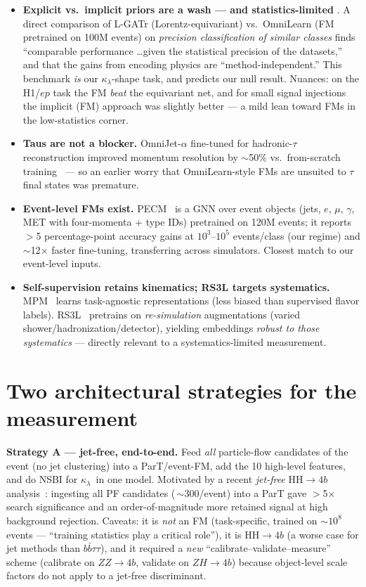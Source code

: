\documentclass[11pt]{article}
\newcommand{\kl}{\ensuremath{\kappa_\lambda}}
\newcommand{\bbtt}{\ensuremath{b\bar b\tau\tau}}
\begin{document}
\begin{itemize}
\item \textbf{Explicit vs.\ implicit priors are a wash --- and statistics-limited}
  \cite{wamorkar}. A direct comparison of L-GATr (Lorentz-equivariant) vs.\ OmniLearn
  (FM pretrained on 100M events) on \emph{precision classification of similar classes}
  finds ``comparable performance \dots given the statistical precision of the
  datasets,'' and that the gains from encoding physics are ``method-independent.''
  This benchmark \emph{is} our \kl-shape task, and predicts our null result. Nuances:
  on the H1/$ep$ task the FM \emph{beat} the equivariant net, and for small signal
  injections the implicit (FM) approach was slightly better --- a mild lean toward
  FMs in the low-statistics corner.
\item \textbf{Taus are not a blocker.} OmniJet-$\alpha$ fine-tuned for hadronic-$\tau$
  reconstruction improved momentum resolution by $\sim$50\% vs.\ from-scratch
  training~\cite{omnijettau} --- so an earlier worry that OmniLearn-style FMs are
  unsuited to $\tau$ final states was premature.
\item \textbf{Event-level FMs exist.} PECM~\cite{pecm} is a GNN over event objects
  (jets, $e$, $\mu$, $\gamma$, MET with four-momenta + type IDs) pretrained on 120M
  events; it reports $>$5 percentage-point accuracy gains at $10^3$--$10^5$
  events/class (our regime) and $\sim$12$\times$ faster fine-tuning, transferring
  across simulators. Closest match to our event-level inputs.
\item \textbf{Self-supervision retains kinematics; RS3L targets systematics.}
  MPM~\cite{mpm} learns task-agnostic representations (less biased than supervised
  flavor labels). RS3L~\cite{rs3l} pretrains on \emph{re-simulation} augmentations
  (varied shower/hadronization/detector), yielding embeddings \emph{robust to those
  systematics} --- directly relevant to a systematics-limited measurement.
\end{itemize}

\section{Two architectural strategies for the measurement}
\textbf{Strategy A --- jet-free, end-to-end.} Feed \emph{all} particle-flow
candidates of the event (no jet clustering) into a ParT/event-FM, add the 10
high-level features, and do NSBI for \kl\ in one model. Motivated by a recent
\emph{jet-free} HH$\to 4b$ analysis~\cite{jetfree4b}: ingesting all PF candidates
(\,$\sim$300/event) into a ParT gave $>$5$\times$ search significance and an
order-of-magnitude more retained signal at high background rejection. Caveats: it is
\emph{not} an FM (task-specific, trained on $\sim$$10^8$ events --- ``training
statistics play a critical role''), it is HH$\to 4b$ (a worse case for jet methods
than \bbtt), and it required a \emph{new} ``calibrate--validate--measure'' scheme
(calibrate on $ZZ\to4b$, validate on $ZH\to4b$) because object-level scale factors do
not apply to a jet-free discriminant.
\end{document}
